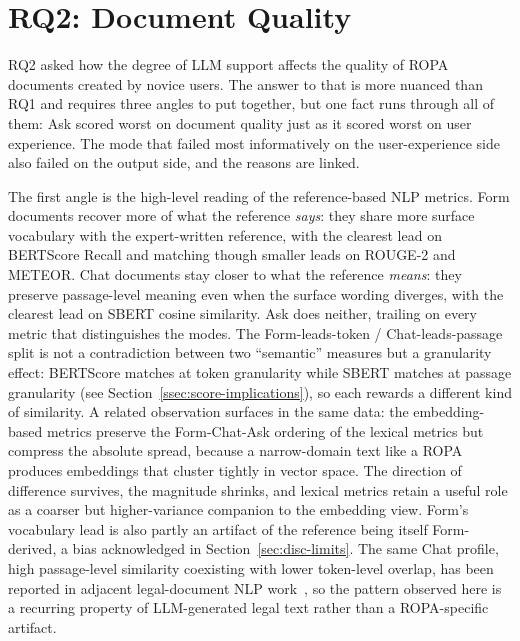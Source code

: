 \section{RQ2: Document Quality}
\label{sec:disc-rq2}

RQ2 asked how the degree of LLM support affects the quality of
ROPA documents created by novice users. The answer to that is more
nuanced than RQ1 and requires three angles to put together, but
one fact runs through all of them: Ask scored worst on document
quality just as it scored worst on user experience. The mode
that failed most informatively on the user-experience side also
failed on the output side, and the reasons are linked.

The first angle is the high-level reading of the reference-based
NLP metrics. Form documents recover more of what the reference
\emph{says}: they share more surface vocabulary with the
expert-written reference, with the clearest lead on BERTScore
Recall and matching though smaller leads on ROUGE-2 and METEOR.
Chat documents stay closer to what the reference \emph{means}:
they preserve passage-level meaning even when the surface
wording diverges, with the clearest lead on SBERT cosine
similarity. Ask does neither, trailing  on every metric
that distinguishes the modes. The Form-leads-token / Chat-leads-passage
split is not a contradiction between two ``semantic'' measures
but a granularity effect: BERTScore matches at token granularity
while SBERT matches at passage granularity (see
Section~\ref{ssec:score-implications}), so each rewards a
different kind of similarity. A related observation surfaces in
the same data: the embedding-based metrics preserve the
Form-Chat-Ask ordering of the lexical metrics but compress the
absolute spread, because a narrow-domain text like a ROPA
produces embeddings that cluster tightly in vector space. The
direction of difference survives, the magnitude shrinks, and
lexical metrics retain a useful role as a coarser but
higher-variance companion to the embedding view. Form's
vocabulary lead is also partly an artifact of the reference
being itself Form-derived, a bias acknowledged in
Section~\ref{sec:disc-limits}. The same
Chat profile, high passage-level similarity coexisting with
lower token-level overlap, has been reported in adjacent
legal-document NLP
work~\cite{abualhaijaLLMassistedExtractionRegulatory2025}, so
the pattern observed here is a recurring property of
LLM-generated legal text rather than a ROPA-specific artifact.


